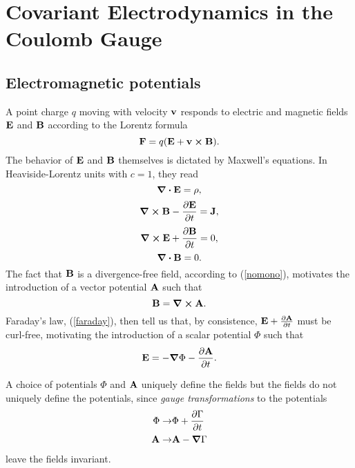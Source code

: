 \chapter{Covariant Electrodynamics in the Coulomb Gauge}
\section{Electromagnetic potentials}
A point charge $q$ moving with velocity $\vb{v}$ responds to electric and magnetic fields $\vb{E}$ and $\vb{B}$ according to the Lorentz formula
\begin{equation}
    \vb{F}=q(\vb{E}+\vb{v}\cross\vb{B}).
\end{equation}
The behavior of $\vb{E}$ and $\vb{B}$ themselves is dictated by Maxwell's equations. In Heaviside-Lorentz units with $c=1$, they read
\begin{equation}
    \div{\vb{E}}=\rho,
    \label{gauss}
\end{equation}
\begin{equation}
    \curl\vb{B}-\pdv{\vb{E}}{t}=\vb{J},
    \label{amperemaxwell}
\end{equation}
\begin{equation}
    \curl\vb{E}+\pdv{\vb{B}}{t}=0,
    \label{faraday}
\end{equation}
\begin{equation}
    \div\vb{B}=0.
    \label{nomono}
\end{equation}
The fact that $\vb{B}$ is a divergence-free field, according to (\ref{nomono}), motivates the introduction of a vector potential $\vb{A}$ such that
\begin{equation}
    \vb{B}=\curl\vb{A}.
\end{equation}
Faraday's law, (\ref{faraday}), then tell us that, by consistence, $\vb{E}+\pdv{\vb{A}}{t}$ must be  curl-free, motivating the introduction of a scalar potential $\Phi$ such that
\begin{equation}
    \vb{E}=-\grad\Phi-\pdv{\vb{A}}{t}.
    \label{E_phi_A}
\end{equation}

A choice of potentials $\Phi$ and $\vb{A}$ uniquely define the fields but the fields do not uniquely define the potentials, since \textit{gauge transformations} to the potentials
\begin{equation}
\begin{aligned}
    \Phi\to&\Phi+\pdv{\Gamma}{t}\\
    \vb{A}\to&\vb{A}-\grad\Gamma
    \label{gauge}
\end{aligned}
\end{equation}
leave the fields invariant.
